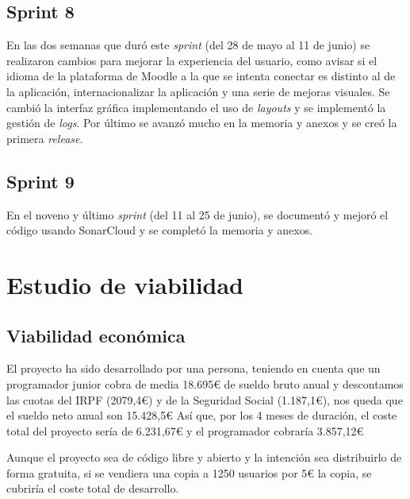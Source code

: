 \subsection{Sprint 8}

En las dos semanas que duró este \textit{sprint} (del 28 de mayo al 11 de junio) se realizaron cambios para mejorar la experiencia del usuario, como avisar si el idioma de la plataforma de Moodle a la que se intenta conectar es distinto al de la aplicación, internacionalizar la aplicación y una serie de mejoras visuales. Se cambió la interfaz gráfica implementando el uso de \textit{layouts} y se implementó la gestión de \textit{logs}. Por último se avanzó mucho en la memoria y anexos y se creó la primera \textit{release}.

 

\subsection{Sprint 9}

En el noveno y último \textit{sprint} (del 11 al 25 de junio), se documentó y mejoró el código usando SonarCloud y se completó la memoria y anexos.

 

\section{Estudio de viabilidad}

\subsection{Viabilidad económica}

El proyecto ha sido desarrollado por una persona, teniendo en cuenta que un programador junior cobra de media 18.695€\cite{SalariosParaEmpleos} de sueldo bruto anual y descontamos las cuotas del IRPF (2079,4€) y de la Seguridad Social (1.187,1€), nos queda que el sueldo neto anual son 15.428,5€
Así que, por los 4 meses de duración, el coste total del proyecto sería de 6.231,67€ y el programador cobraría 3.857,12€

Aunque el proyecto sea de código libre y abierto y la intención sea distribuirlo de forma gratuita, si se vendiera una copia a 1250 usuarios por 5€ la copia, se cubriría el coste total de desarrollo.


